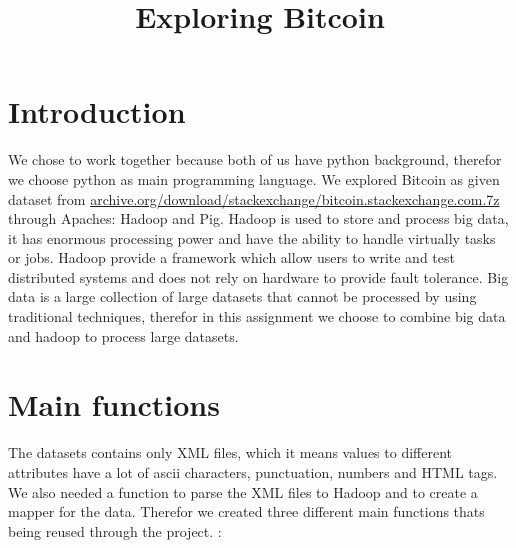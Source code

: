 \documentclass[fleqn,10pt]{wlscirep}
\title{Exploring Bitcoin }
\author{}
\begin{document}





\flushbottom
\maketitle

\tableofcontents
\newpage
\section{Introduction}
We chose to work together because both of us have python background, therefor we choose python as main programming language. We explored Bitcoin as given dataset from \url{archive.org/download/stackexchange/bitcoin.stackexchange.com.7z}  through Apaches: Hadoop and Pig. Hadoop is used to store and process big data, it has enormous processing power and have the ability to handle virtually  tasks or jobs. Hadoop provide a framework which allow users to write and test distributed systems and does not rely on hardware to provide fault tolerance. Big data is a large collection of large datasets that cannot be processed by using traditional techniques, therefor in this assignment we choose to combine big data and hadoop to process large datasets. 

\section{Main functions}
The datasets contains only XML files, which it means values to different attributes have a lot of  ascii characters, punctuation, numbers and HTML tags. We also needed a function to parse the XML files to Hadoop and to create a mapper for the data.  Therefor we created three different main functions thats being reused through the project. : 
\end{document}
